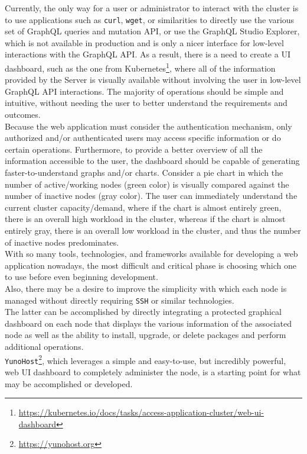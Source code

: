 Currently, the only way for a user or administrator to interact with the cluster
is to use applications such as \texttt{curl}, \texttt{wget}, or similarities to
directly use the various set of GraphQL queries and mutation API, or use the GraphQL
Studio Explorer, which is not available in production and is only a nicer
interface for low-level interactions with the GraphQL API. As a result, there is
a need to create a UI dashboard, such as the one from Kubernetes\footnote{\url{https://kubernetes.io/docs/tasks/access-application-cluster/web-ui-dashboard}},
where all of the information provided by the Server is visually available
without involving the user in low-level GraphQL API interactions. The majority of
operations should be simple and intuitive, without needing the user to better
understand the requirements and outcomes. \\ %
Because the web application must consider the authentication mechanism, only authorized
and/or authenticated users may access specific information or do certain operations.
Furthermore, to provide a better overview of all the information accessible to the
user, the dashboard should be capable of generating faster-to-understand graphs
and/or charts. Consider a pie chart in which the number of active/working nodes (green
color) is visually compared against the number of inactive nodes (gray color).
The user can immediately understand the current cluster capacity/demand, where if
the chart is almost entirely green, there is an overall high workload in the
cluster, whereas if the chart is almost entirely gray, there is an overall low
workload in the cluster, and thus the number of inactive nodes predominates. \\ %
With so many tools, technologies, and frameworks available for developing a web application
nowadays, the most difficult and critical phase is choosing which one to use
before even beginning development. \\ %
Also, there may be a desire to improve the simplicity with which each node is managed
without directly requiring \texttt{SSH} or similar technologies. \\ %
The latter can be accomplished by directly integrating a protected graphical
dashboard on each node that displays the various information of the associated
node as well as the ability to install, upgrade, or delete packages and perform
additional operations. \\ %
\texttt{YunoHost}\footnote{\url{https://yunohost.org}}, which leverages a simple
and easy-to-use, but incredibly powerful, web UI dashboard to completely
administer the node, is a starting point for what may be accomplished or developed.
\\ %

